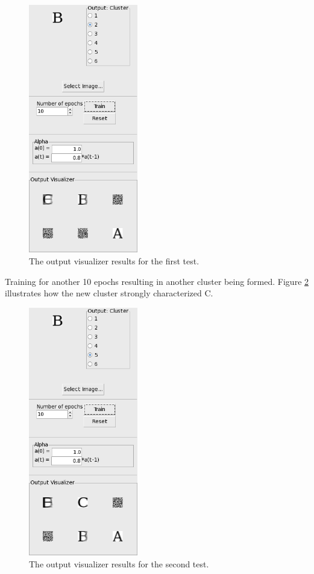 \documentclass[12pt,letterpaper,oneside]{report}
\begin{document}
\begin{figure}[ht]
  \centering
  \includegraphics[width=180px]{diagrams/first-test.png} 
  \caption{The output visualizer results for the first test.}
  \label{fig:first-test}
\end{figure}

Training for another 10 epochs resulting in another cluster being formed. Figure \ref{fig:second-test} illustrates how the new cluster strongly characterized C.

\begin{figure}[ht]
  \centering
  \includegraphics[width=180px]{diagrams/second-test.png} 
  \caption{The output visualizer results for the second test.}
  \label{fig:second-test}
\end{figure}
\end{document}
